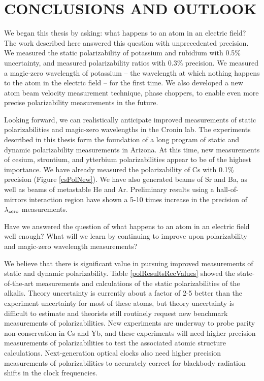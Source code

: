 \chapter{CONCLUSIONS AND OUTLOOK}
\label{conclusions}

We began this thesis by asking: what happens to an atom in an electric field? The work described here answered this question with unprecedented precision. We measured the static polarizability of potassium and rubidium with 0.5\% uncertainty, and measured polarizability ratios with 0.3\% precision. We measured a magic-zero wavelength of potassium -- the wavelength at which nothing happens to the atom in the electric field -- for the first time. We also developed a new atom beam velocity measurement technique, phase choppers, to enable even more precise polarizability measurements in the future. 

Looking forward, we can realistically anticipate improved measurements of static polarizabilities and magic-zero wavelengths in the Cronin lab. The experiments described in this thesis form the foundation of a long program of static and dynamic polarizability measurements in Arizona. At this time, new measurements of cesium, strontium, and ytterbium polarizabilities appear to be of the highest importance. We have already measured the polarizability of Cs with 0.1\% precision (Figure \ref{csPolNew}). We have also generated beams of Sr and Ba, as well as beams of metastable He and Ar. Preliminary results using a hall-of-mirrors interaction region have shown a 5-10 times increase in the precision of $\lambda_\textrm{zero}$ measurements.

Have we answered the question of what happens to an atom in an electric field well enough? What will we learn by continuing to improve upon polarizability and magic-zero wavelength measurements?

We believe that there is significant value in pursuing improved measurements of static and dynamic polarizability. Table \ref{polResultsRecValues} showed the state-of-the-art measurements and calculations of the static polarizabilities of the alkalis. Theory uncertainty is currently about a factor of 2-5 better than the experiment uncertainty for most of these atoms, but theory uncertainty is difficult to estimate and theorists still routinely request new benchmark measurements of polarizabilities. New experiments are underway to probe parity non-conservation in Cs and Yb, and these experiments will need higher precision measurements of polarizabilities to test the associated atomic structure calculations. Next-generation optical clocks also need higher precision measurements of polarizabilities to accurately correct for blackbody radiation shifts in the clock frequencies. 

